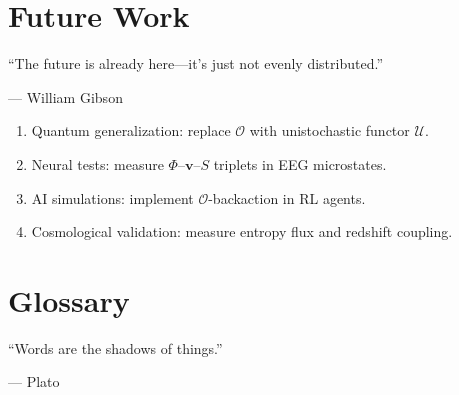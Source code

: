\documentclass[12pt]{book}
\theoremstyle{definition}
\begin{document}
\begin{minipage}{\textwidth}

\end{minipage}

\chapter*{Future Work}
\epigraph{``The future is already here—it’s just not evenly distributed.''}{--- William Gibson}

\begin{enumerate}
\item Quantum generalization: replace \(\mathcal{O}\) with unistochastic functor \(\mathcal{U}\).
\item Neural tests: measure \(\Phi\)–\(\mathbf{v}\)–\(S\) triplets in EEG microstates.
\item AI simulations: implement \(\mathcal{O}\)-backaction in RL agents.
\item Cosmological validation: measure entropy flux and redshift coupling.
\end{enumerate}

\chapter*{Glossary}
\epigraph{``Words are the shadows of things.''}{--- Plato}
\end{document}
